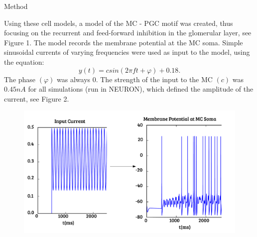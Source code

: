 \documentclass[final,hyperref={pdfpagelabels=false}]{beamer}
\begin{document}
\begin{frame}{}
\begin{columns}[t]
\begin{column}{.48\linewidth}
\begin{block}{Method}
      	
      	
      		
      		
      	Using these cell models, a model of the MC - PGC motif was created, thus focusing on the recurrent and feed-forward inhibition in the glomerular layer, see Figure 1. 
      	The model records the membrane potential at the MC soma.
      	Simple sinusoidal currents of varying frequencies were used as input to the model, using the equation:
      	\begin{equation}
      	y(t) = csin(2 \pi ft + \varphi) + 0.18. 
      	\end{equation}
      	The phase $(\varphi)$ was always $0$. The strength of the input to the MC $(c)$ was $0.45nA$ for all simulations (run in NEURON), which defined the amplitude of the current, see Figure 2. 
      	
		\begin{figure}
      		\center
      		\includegraphics[scale=1.2]{images/Figure2}
      		\end{figure} 
      		

\end{block}
\end{column}
\end{columns}
\end{frame}
\end{document}
